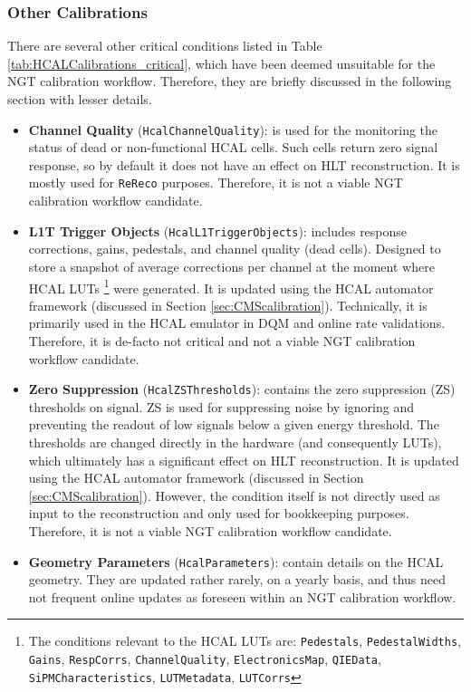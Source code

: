 \subsubsection{Other Calibrations}
There are several other critical conditions listed in Table \ref{tab:HCALCalibrations_critical}, which have been deemed unsuitable for the NGT calibration workflow. Therefore, they are briefly discussed in the following section with lesser details.

\begin{itemize}
    \item \textbf{Channel Quality} (\texttt{HcalChannelQuality}): is used for the monitoring the status of dead or non-functional HCAL cells. Such cells return zero signal response, so by default it does not have an effect on HLT reconstruction. It is mostly used for \texttt{ReReco} purposes. Therefore, it is not a viable NGT calibration workflow candidate.
    \item \textbf{L1T Trigger Objects} (\texttt{HcalL1TriggerObjects}): includes response corrections, gains, pedestals, and channel quality (dead cells). Designed to store a snapshot of average corrections per channel at the moment where HCAL LUTs \footnote{The conditions relevant to the HCAL LUTs are: \texttt{Pedestals}, \texttt{PedestalWidths}, \texttt{Gains}, \texttt{RespCorrs}, \texttt{ChannelQuality}, \texttt{ElectronicsMap}, \texttt{QIEData}, \texttt{SiPMCharacteristics}, \texttt{LUTMetadata}, \texttt{LUTCorrs}} were generated. It is updated using the HCAL automator framework (discussed in Section \ref{sec:CMScalibration}). Technically, it is primarily used in the HCAL emulator in DQM and online rate validations. Therefore, it is de-facto not critical and not a viable NGT calibration workflow candidate. %
    \item \textbf{Zero Suppression} (\texttt{HcalZSThresholds}): contains the zero suppression (ZS) thresholds on signal. ZS is used for suppressing noise by ignoring and preventing the readout of low signals below a given energy threshold. The thresholds are changed directly in the hardware (and consequently LUTs), which ultimately has a significant effect on HLT reconstruction. It is updated using the HCAL automator framework (discussed in Section \ref{sec:CMScalibration}). However, the condition itself is not directly used as input to the reconstruction and only used for bookkeeping purposes. Therefore, it is not a viable NGT calibration workflow candidate.
    \item \textbf{Geometry Parameters} (\texttt{HcalParameters}): contain details on the HCAL geometry. They are updated rather rarely, on a yearly basis, and thus need not frequent online updates as foreseen within an NGT calibration workflow.
\end{itemize}

